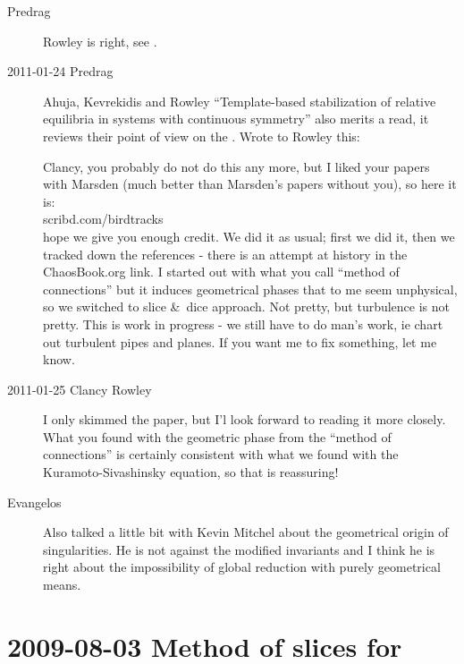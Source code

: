 \begin{description}
\item[Predrag]
Rowley is right, see .

\item[2011-01-24 Predrag]
Ahuja, Kevrekidis and Rowley
{``Template-based stabilization} of relative equilibria
              in systems with continuous symmetry'' also
merits a read, it reviews their point of view on the \mslices. Wrote to
Rowley this:

Clancy, you probably do not do this any more, but I liked your papers
with Marsden (much better than Marsden's papers without you), so here it
is:
\\
{scribd.com/birdtracks}
\\
hope we give you enough credit. We did it as usual; first we did it, then we tracked
down the references - there is an attempt at history in the ChaosBook.org link.
I started out with what you call ``method of connections'' but it induces
geometrical phases that to me seem unphysical, so we switched to
slice \&\ dice approach. Not pretty, but turbulence is not pretty.
This is work in progress - we still have to do man's work, ie chart out
turbulent pipes and planes. If you want me to fix something, let me know.

\item[2011-01-25 Clancy Rowley]
I only skimmed the paper, but I'l look forward
to reading it more closely.  What you found with the geometric phase from
the ``method of connections'' is certainly consistent with what we found
with the Kuramoto-Sivashinsky equation, so that is reassuring!

\item[Evangelos]
Also talked a little bit with Kevin Mitchel about the geometrical origin
of singularities. He is not against the modified invariants and I think
he is right about the impossibility of global reduction with purely
geometrical means.

\end{description}

\section{2009-08-03 Method of slices for \cLf}
\renewcommand{\ssp}{x}
\renewcommand{\vel}{\ensuremath{v}}   %

